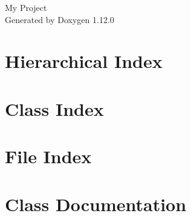 \documentclass[twoside]{book}
\newcommand{\+}{\discretionary{\mbox{\scriptsize$\hookleftarrow$}}{}{}}
\newcommand{\clearemptydoublepage}{%
    \newpage{\pagestyle{empty}\cleardoublepage}%
  }
\begin{document}
  \raggedbottom
    \hypersetup{pageanchor=false,
                bookmarksnumbered=true,
                pdfencoding=unicode
               }
  \begin{titlepage}
  \vspace*{7cm}
  \begin{center}%
  {\Large My Project}\\
  \vspace*{1cm}
  {\large Generated by Doxygen 1.12.0}\\
  \end{center}
  \end{titlepage}
  \clearemptydoublepage
  \tableofcontents
  \clearemptydoublepage
  \hypersetup{pageanchor=true}

\chapter{Hierarchical Index}

\chapter{Class Index}

\chapter{File Index}

\chapter{Class Documentation}






























\end{document}
